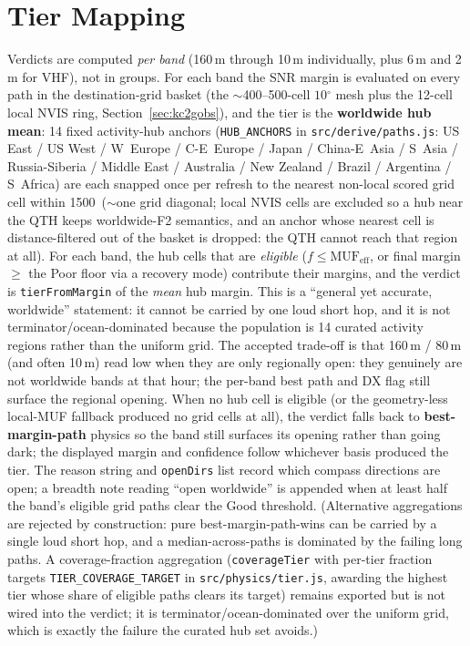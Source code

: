\documentclass[11pt,a4paper]{article}
\newcommand{\SI}[2]{#1\,\text{#2}}
\newcommand{\km}{\text{km}}
\newcommand{\degree}{\ensuremath{{}^\circ}}
\begin{document}
\section{Tier Mapping}\label{sec:tiers}

Verdicts are computed \emph{per band} (160\,m through 10\,m
individually, plus 6\,m and 2\,m for VHF), not in groups.  For
each band the SNR margin is evaluated on every path in the
destination-grid basket (the ${\sim}$400--500-cell $10\degree$
mesh plus the 12-cell local NVIS ring,
Section~\ref{sec:kc2gobs}), and the tier is the
\textbf{worldwide hub mean}: 14 fixed activity-hub anchors
(\texttt{HUB\_ANCHORS} in \texttt{src/derive/paths.js}: US
East / US West / W~Europe / C-E~Europe / Japan / China-E~Asia /
S~Asia / Russia-Siberia / Middle East / Australia / New Zealand /
Brazil / Argentina / S~Africa) are each snapped once per refresh
to the nearest non-local scored grid cell within
\SI{1500}{\km} (${\sim}$one grid diagonal; local NVIS cells are
excluded so a hub near the QTH keeps worldwide-F2 semantics, and
an anchor whose nearest cell is distance-filtered out of the
basket is dropped: the QTH cannot reach that region at all).
For each band, the hub cells that are \emph{eligible}
($f \le \text{MUF}_{\text{eff}}$, or final margin $\ge$ the Poor
floor via a recovery mode) contribute their margins, and the
verdict is \texttt{tierFromMargin} of the \emph{mean} hub
margin.  This is a ``general yet accurate, worldwide''
statement: it cannot be carried by one loud short hop, and it is
not terminator/ocean-dominated because the population is 14
curated activity regions rather than the uniform grid.  The
accepted trade-off is that 160\,m / 80\,m (and often 10\,m) read
low when they are only regionally open: they genuinely are
not worldwide bands at that hour; the per-band best path and DX
flag still surface the regional opening.  When no hub cell is
eligible (or the geometry-less local-MUF fallback produced no
grid cells at all), the verdict falls back to
\textbf{best-margin-path} physics so the band still surfaces its
opening rather than going dark; the displayed margin and
confidence follow whichever basis produced the tier.  The reason
string and \texttt{openDirs} list record which compass
directions are open; a breadth note reading ``open worldwide''
is appended when at least half the band's eligible grid paths
clear the Good threshold.  (Alternative aggregations are
rejected by construction: pure best-margin-path-wins can be
carried by a
single loud short hop, and a median-across-paths is dominated
by the failing long paths.  A coverage-fraction aggregation
(\texttt{coverageTier} with per-tier fraction targets
\texttt{TIER\_COVERAGE\_TARGET} in \texttt{src/physics/tier.js},
awarding the highest tier whose share of eligible paths clears
its target) remains exported but is not wired into the
verdict; it is terminator/ocean-dominated
over the uniform grid, which is exactly the failure the curated
hub set avoids.)
\end{document}
